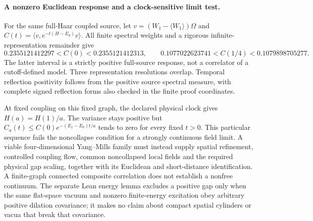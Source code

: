\paragraph{A nonzero Euclidean response and a clock-sensitive limit test.}
For the same full-Haar coupled source, let
$v=(W_1-\langle W_1\rangle)\Omega$ and
$C(t)=\langle v,e^{-t(H-E_0)}v\rangle$.
All finite spectral weights and a rigorous infinite-representation
remainder give
\[
  0.2355121412297 < C(0)<0.2355121412313,
  \qquad
  0.1077022623741<C(1/4)<0.1079898705277.
\]
The latter interval is a strictly positive full-source response, not a
correlator of a cutoff-defined model.  Three representation resolutions
overlap.  Temporal reflection positivity follows from the positive
source spectral measure, with complete signed reflection forms also
checked in the finite proof coordinates.

At fixed coupling on this fixed graph, the declared physical clock gives
$H(a)=H(1)/a$.  The variance stays positive but
$C_a(t)\leq C(0)e^{-(E_1-E_0)t/a}$ tends to zero for every fixed $t>0$.
This particular sequence fails the noncollapse condition for a strongly
continuous field limit.  A viable four-dimensional Yang--Mills family
must instead supply spatial refinement, controlled coupling flow, common
noncollapsed local fields and the required physical gap scaling, together
with its Euclidean and short-distance identification.  A finite-graph
connected composite correlation does not establish a nonfree continuum.
The separate Lean energy lemma excludes a positive gap only when the
same flat-space vacuum and nonzero finite-energy excitation obey
arbitrary positive dilation covariance; it makes no claim about compact
spatial cylinders or vacua that break that covariance.
